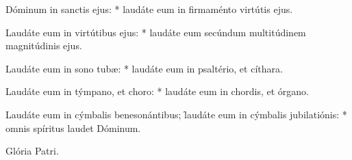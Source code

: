\begin{psalmus}

		 Dóminum in sanctis ejus: * laudáte eum in firmaménto virtútis ejus.

		Laudáte eum in virtútibus ejus: * laudáte eum secúndum multitúdinem magnitúdinis ejus.

		Laudáte eum in sono tubæ: * laudáte eum in psaltério, et cíthara.

		Laudáte eum in týmpano, et choro: * laudáte eum in chordis, et órgano.

		Laudáte eum in cýmbalis benesonántibus; \f laudáte eum in cýmbalis jubilatiónis: * omnis spíritus laudet Dóminum.

		Glória Patri.

\end{psalmus}

